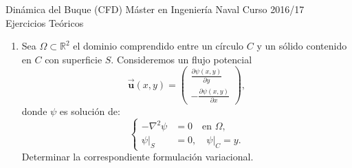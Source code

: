 \documentclass{article}
\newcommand{\Rset}{\mathbb{R}}
\newcommand{\uu}{\vec{\mathbf{u}}}
\newcommand{\dx}[1]{\frac{\partial #1}{\partial x}}
\newcommand{\dy}[1]{\frac{\partial #1}{\partial y}}
\newcommand{\laplace}{\nabla^2}
\begin{document}
\begin{titlepage}
  \begin{center}
    Dinámica del Buque (CFD) \hfill Máster en Ingeniería Naval \hfill
    Curso 2016/17
    \\[2em]
    {\LARGE Ejercicios Teóricos}
\end{center}

\bigskip

\begin{enumerate}
\item Sea $\Omega\subset \Rset^2$ el dominio comprendido entre un
  círculo $C$ y un sólido contenido en $C$ con superficie
  $S$. Consideremos un flujo potencial
  $$
  \uu(x,y)=
  \left(
    \begin{array}{r}
      \dy{\psi(x,y)} \\ [0.5em]
      -\dx{\psi(x,y)}
    \end{array}
  \right),
  $$
  donde $\psi$ es solución de:
  \begin{equation*}
   \left\{
     \begin{aligned}
       -\laplace\psi &=0 \quad \text{en } \Omega ,\\
       \psi|_S &=0, \quad \psi|_C= y.
     \end{aligned}
   \right.
 \end{equation*}
 Determinar la correspondiente formulación variacional.


\end{enumerate}
\end{titlepage}
\end{document}
